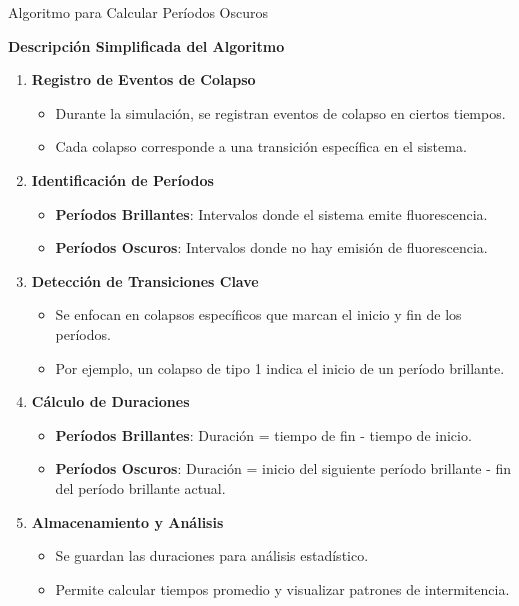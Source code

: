 \documentclass[11pt]{beamer}
\begin{document}
    \begin{frame}{Algoritmo para Calcular Períodos Oscuros}
    
    \textbf{Descripción Simplificada del Algoritmo}
    
    \begin{enumerate} \item \textbf{Registro de Eventos de Colapso} \begin{itemize} \item Durante la simulación, se registran eventos de colapso en ciertos tiempos. \item Cada colapso corresponde a una transición específica en el sistema. \end{itemize} \vspace{0.5em} \item \textbf{Identificación de Períodos} \begin{itemize} \item \textbf{Períodos Brillantes}: Intervalos donde el sistema emite fluorescencia. \item \textbf{Períodos Oscuros}: Intervalos donde no hay emisión de fluorescencia. \end{itemize} \vspace{0.5em} \item \textbf{Detección de Transiciones Clave} \begin{itemize} \item Se enfocan en colapsos específicos que marcan el inicio y fin de los períodos. \item Por ejemplo, un colapso de tipo 1 indica el inicio de un período brillante. \end{itemize} \vspace{0.5em} \item \textbf{Cálculo de Duraciones} \begin{itemize} \item \textbf{Períodos Brillantes}: Duración = tiempo de fin - tiempo de inicio. \item \textbf{Períodos Oscuros}: Duración = inicio del siguiente período brillante - fin del período brillante actual. \end{itemize} \vspace{0.5em} \item \textbf{Almacenamiento y Análisis} \begin{itemize} \item Se guardan las duraciones para análisis estadístico. \item Permite calcular tiempos promedio y visualizar patrones de intermitencia. \end{itemize} \end{enumerate}
    
\end{frame}
\end{document}

